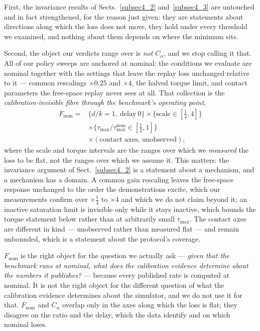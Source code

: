 \documentclass[pdflatex,iicol,sn-apa]{sn-jnl}
\theoremstyle{remark}
\begin{document}
First, the invariance results of Sects.~\ref{subsec4_2} and~\ref{subsec4_3} are untouched and in fact
strengthened, for the reason just given: they are statements about directions along which the loss
does not move, they hold under every threshold we examined, and nothing about them depends on where
the minimum sits.

Second, the object our verdicts range over is \emph{not} $C_\alpha$, and we stop calling it that. All
of our policy sweeps are anchored at nominal: the conditions we evaluate are nominal together with
the settings that leave the replay loss unchanged relative to it --- common rescalings
$\times 0.25$ and $\times 4$, the halved torque limit, and contact parameters the free-space replay
never sees at all. That collection is the \emph{calibration-invisible fibre through the benchmark's
operating point},
\begin{equation}\label{eq:cset2}
\begin{split}
F_{\mathrm{nom}} = {}
  &\{d/k = 1,\ \text{delay}\ 0\}
   \times \{\text{scale} \in [\tfrac14, 4]\} \\[-2pt]
  &\times \{\tau_{\max}/\tau_{\max}^{\mathrm{nom}} \in [\tfrac12, 1]\} \\[-2pt]
  &\times (\text{contact axes, unobserved}),
\end{split}
\end{equation}
where the scale and torque intervals are the ranges over which we \emph{measured} the loss to be
flat, not the ranges over which we assume it. This matters: the invariance argument of
Sect.~\ref{subsec4_2} is a statement about a mechanism, and a mechanism has a domain. A common gain
rescaling leaves the free-space response unchanged to the order the demonstrations excite, which our
measurements confirm over $\times \tfrac14$ to $\times 4$ and which we do not claim beyond it; an
inactive saturation limit is invisible only while it stays inactive, which bounds the torque
statement below rather than at arbitrarily small $\tau_{\max}$. The contact axes are different in
kind --- unobserved rather than measured flat --- and remain unbounded, which is a statement about
the protocol's coverage.

$F_{\mathrm{nom}}$ is the right object for the question we actually ask --- \emph{given that the
benchmark runs at nominal, what does the calibration evidence determine about the numbers it
publishes?} --- because every published rate is computed at nominal. It is not the right object for
the different question of what the calibration evidence determines about the simulator, and we do not
use it for that. $F_{\mathrm{nom}}$ and $C_\alpha$ overlap only in the axes along which the loss is
flat; they disagree on the ratio and the delay, which the data identify and on which nominal loses.
\end{document}
